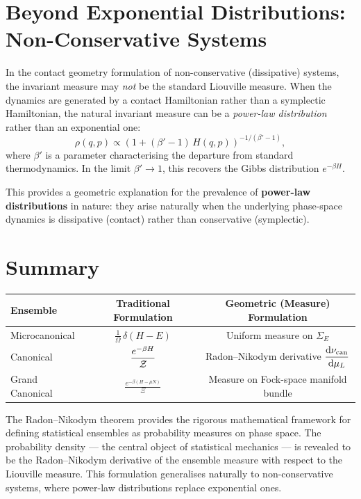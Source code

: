 \section{Beyond Exponential Distributions: Non-Conservative Systems}

In the contact geometry formulation of non-conservative (dissipative) systems, the invariant measure may \emph{not} be the standard Liouville measure. When the dynamics are generated by a contact Hamiltonian rather than a symplectic Hamiltonian, the natural invariant measure can be a \emph{power-law distribution} rather than an exponential one:
\begin{equation}
\rho(q, p) \propto \left(1 + (\beta' - 1)\,H(q,p)\right)^{-1/(\beta'-1)},
\end{equation}
where $\beta'$ is a parameter characterising the departure from standard thermodynamics. In the limit $\beta' \to 1$, this recovers the Gibbs distribution $e^{-\beta H}$.

This provides a geometric explanation for the prevalence of \textbf{power-law distributions} in nature: they arise naturally when the underlying phase-space dynamics is dissipative (contact) rather than conservative (symplectic).

\section{Summary}

\begin{table}[H]
\centering
\renewcommand{\arraystretch}{1.6}
\begin{tabular}{lcc}
\toprule
\textbf{Ensemble} & \textbf{Traditional Formulation} & \textbf{Geometric (Measure) Formulation} \\
\midrule
Microcanonical & $\displaystyle\frac{1}{\Omega}\,\delta(H - E)$ & Uniform measure on $\Sigma_E$ \\[6pt]
Canonical & $\displaystyle\frac{e^{-\beta H}}{\mathcal{Z}}$ & Radon--Nikodym derivative $\displaystyle\dv{\nu_{\text{can}}}{\mu_L}$ \\[6pt]
Grand Canonical & $\displaystyle\frac{e^{-\beta(H - \mu N)}}{\Xi}$ & Measure on Fock-space manifold bundle \\
\bottomrule
\end{tabular}
\end{table}

The Radon--Nikodym theorem provides the rigorous mathematical framework for defining statistical ensembles as probability measures on phase space. The probability density --- the central object of statistical mechanics --- is revealed to be the Radon--Nikodym derivative of the ensemble measure with respect to the Liouville measure. This formulation generalises naturally to non-conservative systems, where power-law distributions replace exponential ones.
